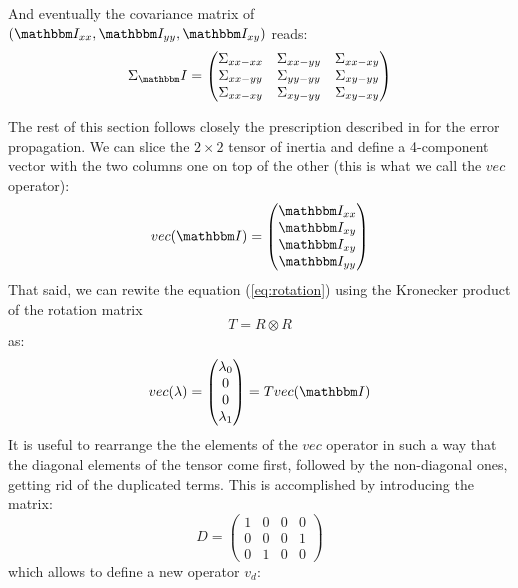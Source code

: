 \documentclass[a4paper,11pt]{article}
\newcommand{\itm}{\mathbbm I}
\newcommand{\itc}[1]{\itm_{#1}}
\begin{document}
And eventually the covariance matrix of $(\itc{xx}, \itc{yy}, \itc{xy})$
reads:
\begin{equation}
  \Sigma_\itm = 
  \begin{pmatrix}
    \Sigma_{xx-xx} & \Sigma_{xx-yy} & \Sigma_{xx-xy}\\
    \Sigma_{xx-yy} & \Sigma_{yy-yy} & \Sigma_{xy-yy}\\
    \Sigma_{xx-xy} & \Sigma_{xy-yy} & \Sigma_{xy-xy}
  \end{pmatrix}
\end{equation}

The rest of this section follows closely the prescription described in
\cite{errors} for the error propagation. We can slice the $2 \times 2$ tensor
of inertia and define a 4-component vector with the two columns one on top 
of the other (this is what we call the $vec$ operator):
\begin{equation}
  vec(\itm) = 
  \begin{pmatrix}
    \itc{xx}\\
    \itc{xy}\\
    \itc{xy}\\
    \itc{yy}
  \end{pmatrix}
\end{equation}
That said, we can rewite the equation (\ref{eq:rotation}) using the
Kronecker product of the rotation matrix
$$
T = R \otimes R
$$
as:
\begin{equation}\label{eq:tensor_transform}
  vec(\lambda) = 
  \begin{pmatrix}
    \lambda_0\\
    0\\
    0\\
    \lambda_1
  \end{pmatrix} = T vec(\itm)
\end{equation}
It is useful to rearrange the the elements of the $vec$ operator in such a way
that the diagonal elements of the tensor come first, followed by the
non-diagonal ones, getting rid of the duplicated terms.
This is accomplished by introducing the matrix:
\begin{equation}
  D = 
  \begin{pmatrix}
    1 & 0 & 0 & 0\\
    0 & 0 & 0 & 1\\
    0 & 1 & 0 & 0
  \end{pmatrix}
\end{equation}
which allows to define a new operator $v_d$:
\end{document}
